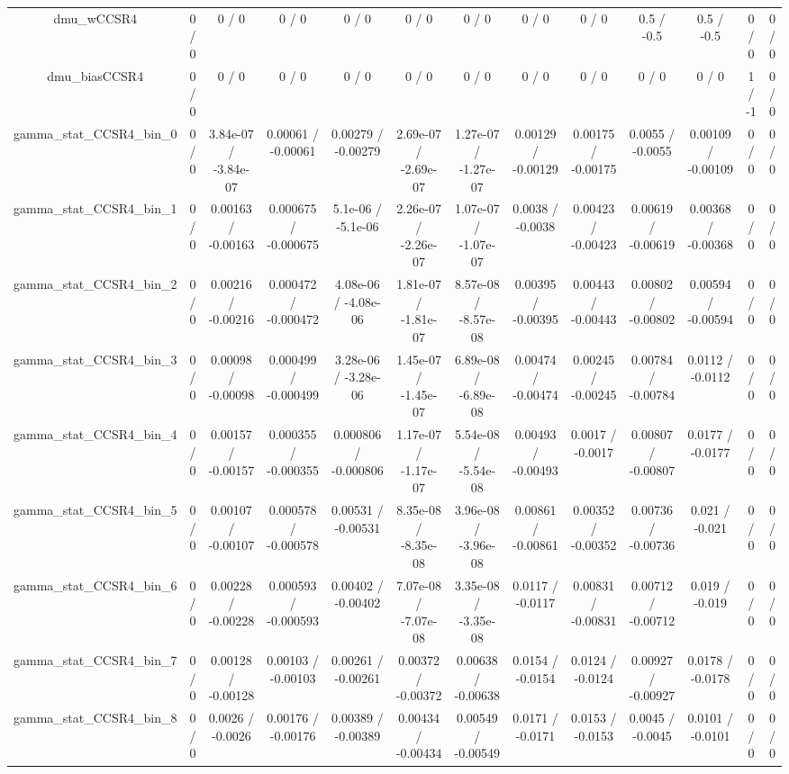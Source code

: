 \documentclass[10pt]{article}
\begin{document}
\begin{table}[htbp]
\begin{center}
\begin{tabular}{|c|c|c|c|c|c|c|c|c|c|c|c|c|}
  dmu_wCCSR4 & 0 / 0 & 0 / 0 & 0 / 0 & 0 / 0 & 0 / 0 & 0 / 0 & 0 / 0 & 0 / 0 & 0.5 / -0.5 & 0.5 / -0.5 & 0 / 0 & 0 / 0 \\ 
  dmu_biasCCSR4 & 0 / 0 & 0 / 0 & 0 / 0 & 0 / 0 & 0 / 0 & 0 / 0 & 0 / 0 & 0 / 0 & 0 / 0 & 0 / 0 & 1 / -1 & 0 / 0 \\ 
  gamma_stat_CCSR4_bin_0 & 0 / 0 & 3.84e-07 / -3.84e-07 & 0.00061 / -0.00061 & 0.00279 / -0.00279 & 2.69e-07 / -2.69e-07 & 1.27e-07 / -1.27e-07 & 0.00129 / -0.00129 & 0.00175 / -0.00175 & 0.0055 / -0.0055 & 0.00109 / -0.00109 & 0 / 0 & 0 / 0 \\ 
  gamma_stat_CCSR4_bin_1 & 0 / 0 & 0.00163 / -0.00163 & 0.000675 / -0.000675 & 5.1e-06 / -5.1e-06 & 2.26e-07 / -2.26e-07 & 1.07e-07 / -1.07e-07 & 0.0038 / -0.0038 & 0.00423 / -0.00423 & 0.00619 / -0.00619 & 0.00368 / -0.00368 & 0 / 0 & 0 / 0 \\ 
  gamma_stat_CCSR4_bin_2 & 0 / 0 & 0.00216 / -0.00216 & 0.000472 / -0.000472 & 4.08e-06 / -4.08e-06 & 1.81e-07 / -1.81e-07 & 8.57e-08 / -8.57e-08 & 0.00395 / -0.00395 & 0.00443 / -0.00443 & 0.00802 / -0.00802 & 0.00594 / -0.00594 & 0 / 0 & 0 / 0 \\ 
  gamma_stat_CCSR4_bin_3 & 0 / 0 & 0.00098 / -0.00098 & 0.000499 / -0.000499 & 3.28e-06 / -3.28e-06 & 1.45e-07 / -1.45e-07 & 6.89e-08 / -6.89e-08 & 0.00474 / -0.00474 & 0.00245 / -0.00245 & 0.00784 / -0.00784 & 0.0112 / -0.0112 & 0 / 0 & 0 / 0 \\ 
  gamma_stat_CCSR4_bin_4 & 0 / 0 & 0.00157 / -0.00157 & 0.000355 / -0.000355 & 0.000806 / -0.000806 & 1.17e-07 / -1.17e-07 & 5.54e-08 / -5.54e-08 & 0.00493 / -0.00493 & 0.0017 / -0.0017 & 0.00807 / -0.00807 & 0.0177 / -0.0177 & 0 / 0 & 0 / 0 \\ 
  gamma_stat_CCSR4_bin_5 & 0 / 0 & 0.00107 / -0.00107 & 0.000578 / -0.000578 & 0.00531 / -0.00531 & 8.35e-08 / -8.35e-08 & 3.96e-08 / -3.96e-08 & 0.00861 / -0.00861 & 0.00352 / -0.00352 & 0.00736 / -0.00736 & 0.021 / -0.021 & 0 / 0 & 0 / 0 \\ 
  gamma_stat_CCSR4_bin_6 & 0 / 0 & 0.00228 / -0.00228 & 0.000593 / -0.000593 & 0.00402 / -0.00402 & 7.07e-08 / -7.07e-08 & 3.35e-08 / -3.35e-08 & 0.0117 / -0.0117 & 0.00831 / -0.00831 & 0.00712 / -0.00712 & 0.019 / -0.019 & 0 / 0 & 0 / 0 \\ 
  gamma_stat_CCSR4_bin_7 & 0 / 0 & 0.00128 / -0.00128 & 0.00103 / -0.00103 & 0.00261 / -0.00261 & 0.00372 / -0.00372 & 0.00638 / -0.00638 & 0.0154 / -0.0154 & 0.0124 / -0.0124 & 0.00927 / -0.00927 & 0.0178 / -0.0178 & 0 / 0 & 0 / 0 \\ 
  gamma_stat_CCSR4_bin_8 & 0 / 0 & 0.0026 / -0.0026 & 0.00176 / -0.00176 & 0.00389 / -0.00389 & 0.00434 / -0.00434 & 0.00549 / -0.00549 & 0.0171 / -0.0171 & 0.0153 / -0.0153 & 0.0045 / -0.0045 & 0.0101 / -0.0101 & 0 / 0 & 0 / 0 \\ 

\end{tabular}
\end{center}
\end{table}
\end{document}
